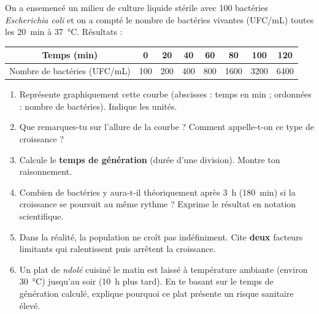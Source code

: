 \documentclass[11pt]{article}
\begin{document}
\begin{exercice}
On a ensemencé un milieu de culture liquide stérile avec \num{100} bactéries \emph{Escherichia coli} et on a compté le nombre de bactéries vivantes (UFC/mL) toutes les \SI{20}{min} à \SI{37}{\celsius}. Résultats :
\begin{center}
\begin{tabular}{|c|c|c|c|c|c|c|c|}\hline
Temps (min) & 0 & 20 & 40 & 60 & 80 & 100 & 120 \\ \hline
Nombre de bactéries (UFC/mL) & \num{100} & \num{200} & \num{400} & \num{800} & \num{1600} & \num{3200} & \num{6400} \\ \hline
\end{tabular}
\end{center}
\begin{enumerate}
\item Représente graphiquement cette courbe (abscisses : temps en min ; ordonnées : nombre de bactéries). Indique les unités.
\item Que remarques-tu sur l'allure de la courbe ? Comment appelle-t-on ce type de croissance ?
\item Calcule le \textbf{temps de génération} (durée d'une division). Montre ton raisonnement.
\item Combien de bactéries y aura-t-il théoriquement après \SI{3}{h} (\SI{180}{min}) si la croissance se poursuit au même rythme ? Exprime le résultat en notation scientifique.
\item Dans la réalité, la population ne croît pas indéfiniment. Cite \textbf{deux} facteurs limitants qui ralentissent puis arrêtent la croissance.
\item Un plat de \emph{ndolé} cuisiné le matin est laissé à température ambiante (environ \SI{30}{\celsius}) jusqu'au soir (\SI{10}{h} plus tard). En te basant sur le temps de génération calculé, explique pourquoi ce plat présente un risque sanitaire élevé.
\end{enumerate}
\end{exercice}
\end{document}
